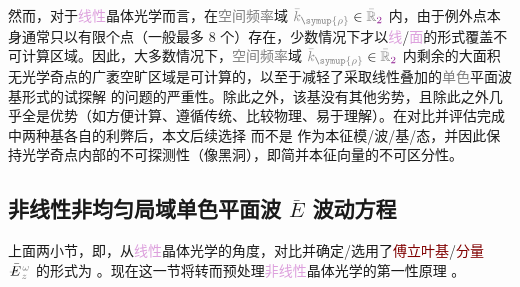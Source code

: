 然而，对于\textcolor{Plum}{线性}\textcolor{PineGreen}{晶体光学}而言，在\textcolor{gray}{空间频率}域 $\mathcolor{gray}{\bar{k}_{\symup{\rho}}} \in \mathcolor{gray}{\bar{\mathbb{R}}_{\textcolor{Plum}{2}}}$ 内，由于\textcolor{PineGreen}{例外点}本身通常只以有限个点（一般最多 8 个\cite{berryOpticalSingularitiesBirefringent2003,berryOpticalSingularitiesBianisotropic2005,sturmPropagationElectromagneticWaves,sturmSingularOpticalAxes2016a,grundmannOpticallyAnisotropicMedia2017}）存在，少数情况下才以\textcolor{Plum}{线}/\textcolor{Plum}{面}的形式覆盖不可计算区域\cite{xieAnalytic3DVector}。因此，大多数情况下，\textcolor{gray}{空间频率}域 $\mathcolor{gray}{\bar{k}_{\symup{\rho}}} \in \mathcolor{gray}{\bar{\mathbb{R}}_{\textcolor{Plum}{2}}}$ 内剩余的大面积无\textcolor{PineGreen}{光学奇点}的广袤空旷区域是可计算的，以至于减轻了采取\textcolor{PineGreen}{线性叠加}的\textcolor{gray}{单色}\textcolor{PineGreen}{平面波基}形式的试探解  的问题的严重性。除此之外，该基没有其他劣势，且除此之外几乎全是优势（如方便计算、遵循传统、比较\textcolor{NavyBlue}{物理}、易于理解）。在对比并评估完成  中\textcolor{PineGreen}{两种基}各自的利弊后，本文后续选择  而不是  作为\textcolor{PineGreen}{本征模}/波/基/态，并因此保持\textcolor{PineGreen}{光学奇点}内部的不可探测性（像黑洞），即简并\textcolor{PineGreen}{本征向量}的不可区分性。


\vspace*{-4.5em}

\subsection{非线性非均匀局域单色平面波 $\bar{E}$ 波动方程}\label{ssec:E-waveq-nonlinear}

上面两小节，即，从\textcolor{Plum}{线性}\textcolor{PineGreen}{晶体光学}的角度，对比并确定/选用了\textcolor{Maroon}{傅立叶基}/\textcolor{Maroon}{分量} $\Xint{\mathcolor{gray}{-}}{25}{\bar{E}}^{\;\!\mathcolor{gray}{\omega}}_{\;\! \mathcolor{gray}{z}}$ 的形式为 。现在这一节将转而预处理\textcolor{Plum}{非线性}\textcolor{PineGreen}{晶体光学}的\textcolor{NavyBlue}{第一性原理} 。

